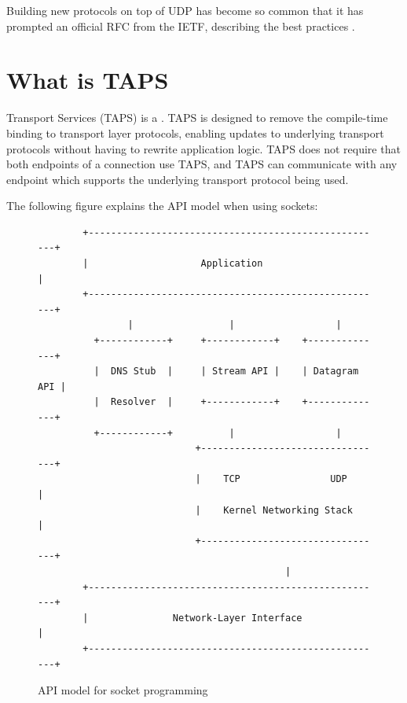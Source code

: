 Building new protocols on top of UDP has become so common that
it has prompted an official RFC from the IETF, describing
the best practices \cite{eggertUnicastUDPUsage2008}. 


\section{What is TAPS}
Transport Services (TAPS) is a 
\cite{trammellAbstractApplicationProgramming2025}. TAPS is
designed to remove the compile-time binding to transport layer
protocols, enabling updates to underlying transport protocols
without having to rewrite application logic. TAPS does not
require that both endpoints of a connection use TAPS, and TAPS
can communicate with any endpoint which supports the underlying
transport protocol being used.

The following figure explains the API model when using
sockets: 

\begin{figure}[H]
    \centering
    \begin{lstlisting}
        +-----------------------------------------------------+
        |                    Application                      |
        +-----------------------------------------------------+
                |                 |                  |
          +------------+     +------------+    +--------------+
          |  DNS Stub  |     | Stream API |    | Datagram API |
          |  Resolver  |     +------------+    +--------------+
          +------------+          |                  |
                            +---------------------------------+
                            |    TCP                UDP       |
                            |    Kernel Networking Stack      |
                            +---------------------------------+
                                            |
        +-----------------------------------------------------+
        |               Network-Layer Interface               |
        +-----------------------------------------------------+
    \end{lstlisting}
    \caption{API model for socket programming \cite{trammellAbstractApplicationProgramming2025}}
\end{figure}

